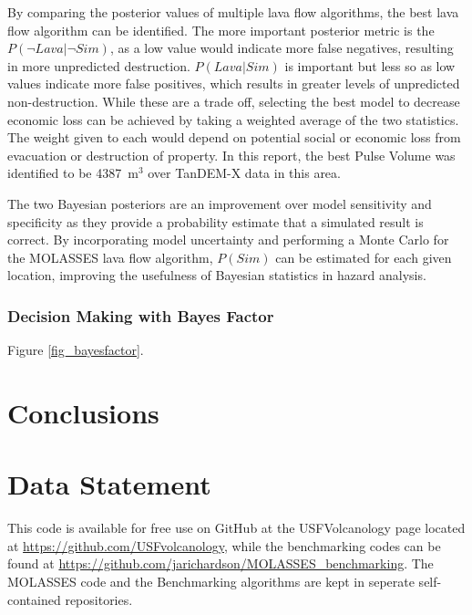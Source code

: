 \documentclass[12pt,letter]{article}
\begin{document}
			By comparing the posterior values of multiple lava flow algorithms, the best lava flow algorithm can be identified. The more important posterior metric is the $P(\neg Lava|\neg Sim)$, as a low value would indicate more false negatives, resulting in more unpredicted destruction. $P(Lava|Sim)$ is important but less so as low values indicate more false positives, which results in greater levels of unpredicted non-destruction. While these are a trade off, selecting the best model to decrease economic loss can be achieved by taking a weighted average of the two statistics. The weight given to each would depend on potential social or economic loss from evacuation or destruction of property. In this report, the best Pulse Volume was identified to be 4387~m$^3$ over TanDEM-X data in this area.

The two Bayesian posteriors are an improvement over model sensitivity and specificity as they provide a probability estimate that a simulated result is correct. By incorporating model uncertainty and performing a Monte Carlo for the MOLASSES lava flow algorithm, $P(Sim)$ can be estimated for each given location, improving the usefulness of Bayesian statistics in hazard analysis.
	
		\subsubsection{Decision Making with Bayes Factor}
		Figure \ref{fig_bayesfactor}.
	
\section{Conclusions}
	
\section{Data Statement}
This code is available for free use on GitHub at the USFVolcanology page located at \url{https://github.com/USFvolcanology}, while the benchmarking codes can be found at \url{https://github.com/jarichardson/MOLASSES_benchmarking}. The MOLASSES code and the Benchmarking algorithms are kept in seperate self-contained repositories.





\end{document}
